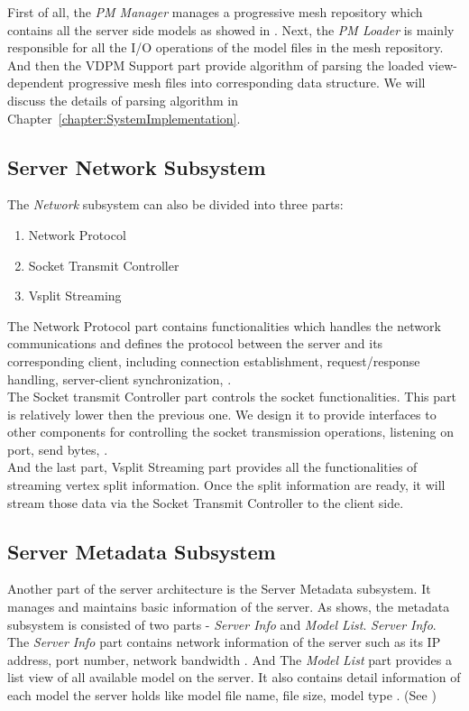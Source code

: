 First of all, the \emph{PM Manager} manages a progressive mesh repository which contains all the server side models as showed in . Next, the \emph{PM Loader} is mainly responsible for all the I/O operations of the model files in the mesh repository. And then the VDPM Support part provide algorithm of parsing the loaded view-dependent progressive mesh files into corresponding data structure. We will discuss the details of parsing algorithm in Chapter~\ref{chapter:SystemImplementation}. 

\subsection{Server Network Subsystem}
\label{section:svrnetcom}

The \emph{Network} subsystem can also be divided into three parts:
\begin{enumerate}
\item
Network Protocol
\item
Socket Transmit Controller
\item
Vsplit Streaming
\end{enumerate}
The Network Protocol part contains functionalities which handles the network communications and defines the protocol between the server and its corresponding client, including connection establishment, request/response handling, server-client synchronization, \etc.\\
The Socket transmit Controller part controls the socket functionalities. This part is relatively lower then the previous one. We design it to provide interfaces to other components for controlling the socket transmission operations, \ie listening on port, send bytes, \etc.\\
And the last part, Vsplit Streaming part provides all the functionalities of streaming vertex split information. Once the split information are ready, it will stream those data via the Socket Transmit Controller to the client side. 
\subsection{Server Metadata Subsystem}
\label{section:svrmtcom}


Another part of the server architecture is the Server Metadata subsystem. It manages and maintains basic information of the server. As  shows, the metadata subsystem is consisted of two parts - \emph{Server Info} and \emph{Model List}. \emph{Server Info}. The \emph{Server Info} part contains network information of the server such as its IP address, port number, network bandwidth \etc. And The \emph{Model List} part provides a list view of all available model on the server. It also contains detail information of each model the server holds like model file name, file size, model type \etc. (See )

